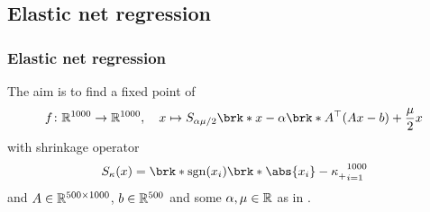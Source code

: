 %
%
%		
%
%
%		

\subsection{Elastic net regression}

\begin{frame}
	\frametitle{Elastic net regression}
	The aim is to find a fixed point of
	\begin{align*}
		f\colon\R^{1000}\to\R^{1000}, \quad x\mapsto S_{\alpha\mu/2}\brk*{x-\alpha\brk*{A^\top(Ax-b)+\frac{\mu}{2}x}}
	\end{align*}
	with shrinkage operator
	\begin{align*}
		S_\kappa(x) = \brk*{\sgn(x_i)\brk*{\abs{x_i}-\kappa}_+}_{i=1}^{1000}
	\end{align*}
	and $A\in\mathbb{R}^{500\times 1000}$, $b\in\mathbb{R}^{500}$ and some $\alpha, \mu\in\mathbb{R}$ as in \cite{ZhaAA}.
\end{frame}



